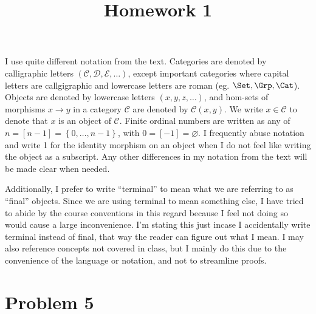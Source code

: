 \documentclass[11pt, letterpaper]{article}
\title{Homework 1}
\begin{document}
\makeproblem

\begin{notation}\label{0.1}
	I use quite different notation from the text. Categories are denoted by calligraphic letters $(\mathcal{C} ,\mathcal{D} ,\mathcal{E} , \ldots )$, except important categories where capital letters are callgigraphic and lowercase letters are roman (eg. $\Set ,\Grp ,\Cat $). Objects are denoted by lowercase letters $(x,y,z, \ldots )$, and hom-sets of morphisms $x\to y$ in a category $\mathcal{C} $ are denoted by $\mathcal{C} (x,y)$. We write $x\in \mathcal{C}$ to denote that $x$ is an object of $\mathcal{C} $. Finite ordinal numbers are written as any of $n=[n-1]=\left\{ 0, \ldots ,n-1 \right\} $, with $0=[-1]=\varnothing $. I frequently abuse notation and write 1 for the identity morphism on an object when I do not feel like writing the object as a subscript. Any other differences in my notation from the text will be made clear when needed.

	Additionally, I prefer to write ``terminal'' to mean what we are referring to as ``final'' objects. Since we are using terminal to mean something else, I have tried to abide by the course conventions in this regard because I feel not doing so would cause a large inconvenience. I'm stating this just incase I accidentally write terminal instead of final, that way the reader can figure out what I mean. I may also reference concepts not covered in class, but I mainly do this due to the convenience of the language or notation, and not to streamline proofs.
\end{notation}


\section{Problem 5}
\end{document}
